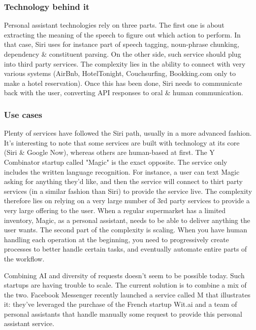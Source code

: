 \documentclass[11pt]{article}
\begin{document}
\subsubsection{Technology behind it }
Personal assistant technologies rely on three parts. 
The first one is about extracting the meaning of the speech to figure out which action to perform. In that case, Siri uses for instance part of speech tagging, noun-phrase chunking, dependency & constituent parsing. 
On the other side, such service should plug into third party services. The complexity lies in the ability to connect with very various systems (AirBnb, HotelTonight, Couchsurfing, Bookking.com only to make a hotel reservation). 
Once this has been done, Siri needs to communicate back with the user, converting API responses to oral & human communication. 

\subsubsection{Use cases}
Plenty of services have followed the Siri path, usually in a more advanced fashion. It's interesting to note that some services are built with technology at its core (Siri & Google Now), whereas others are human-based at first. The Y Combinator startup called "Magic" is the exact opposite. The service only includes the written language recognition. For instance, a user can text Magic asking for anything they'd like, and then the service will connect to thirt party services (in a similar fashion than Siri) to provide the service live. The complexity therefore lies on relying on a very large number of 3rd party services to provide a very large offering to the user. When a regular supermarket has a limited inventory, Magic, as a personal assistant, needs to be able to deliver anything the user wants. The second part of the complexity is scaling. When you have human handling each operation at the beginning, you need to progressively create processes to better handle certain tasks, and eventually automate entire parts of the workflow. 

Combining AI and diversity of requests doesn't seem to be possible today. Such startups are having trouble to scale. The current solution is to combine a mix of the two. Facebook Messenger recently launched a service called M that illustrates it: they've leveraged the purchase of the French startup Wit.ai and a team of personal assistants that handle manually some request to provide this personal assistant service. 
\end{document}
